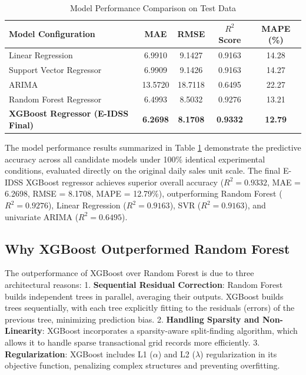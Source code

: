 \documentclass[conference]{IEEEtran}
\begin{document}
\begin{table}[htbp]
\caption{Model Performance Comparison on Test Data}
\label{tab:model_comp_results}
\centering
\begin{tabular}{lcccc}
\toprule
\textbf{Model Configuration} & \textbf{MAE} & \textbf{RMSE} & \textbf{$R^2$ Score} & \textbf{MAPE (\%)} \\
\midrule
Linear Regression & 6.9910 & 9.1427 & 0.9163 & 14.28 \\
Support Vector Regressor & 6.9909 & 9.1426 & 0.9163 & 14.27 \\
ARIMA & 13.5720 & 18.7118 & 0.6495 & 22.27 \\
Random Forest Regressor & 6.4993 & 8.5032 & 0.9276 & 13.21 \\
\textbf{XGBoost Regressor (E-IDSS Final)} & \textbf{6.2698} & \textbf{8.1708} & \textbf{0.9332} & \textbf{12.79} \\
\bottomrule
\end{tabular}
\end{table}

The model performance results summarized in Table \ref{tab:model_comp_results} demonstrate the predictive accuracy across all candidate models under 100\% identical experimental conditions, evaluated directly on the original daily sales unit scale. The final E-IDSS XGBoost regressor achieves superior overall accuracy ($R^2 = 0.9332$, MAE = 6.2698, RMSE = 8.1708, MAPE = 12.79\%), outperforming Random Forest ($R^2 = 0.9276$), Linear Regression ($R^2 = 0.9163$), SVR ($R^2 = 0.9163$), and univariate ARIMA ($R^2 = 0.6495$).

\subsection{Why XGBoost Outperformed Random Forest}
The outperformance of XGBoost over Random Forest is due to three architectural reasons:
1. \textbf{Sequential Residual Correction}: Random Forest builds independent trees in parallel, averaging their outputs. XGBoost builds trees sequentially, with each tree explicitly fitting to the residuals (errors) of the previous tree, minimizing prediction bias.
2. \textbf{Handling Sparsity and Non-Linearity}: XGBoost incorporates a sparsity-aware split-finding algorithm, which allows it to handle sparse transactional grid records more efficiently.
3. \textbf{Regularization}: XGBoost includes L1 ($\alpha$) and L2 ($\lambda$) regularization in its objective function, penalizing complex structures and preventing overfitting.
\end{document}
